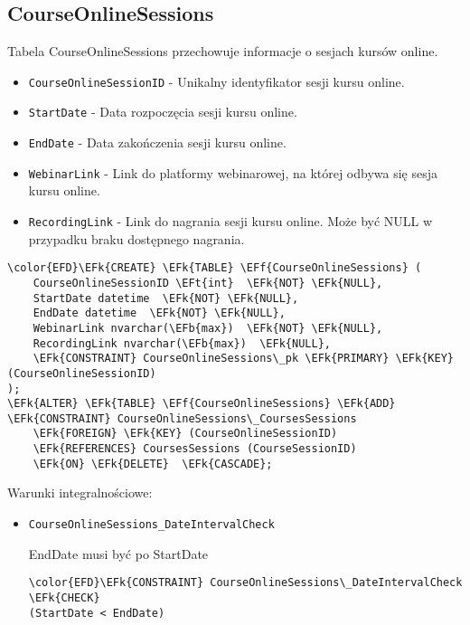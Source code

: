 \documentclass[11pt]{article}
\newcommand{\EFk}[1]{\textcolor{EFk}{\textbf{#1}}} %
\newcommand{\EFb}[1]{\textcolor{EFb}{\textbf{#1}}} %
\newcommand{\EFf}[1]{\textcolor{EFf}{#1}} %
\newcommand{\EFt}[1]{\textcolor{EFt}{\textbf{#1}}} %
\begin{document}
\subsection{CourseOnlineSessions}
\label{sec:org0bfe470}
Tabela CourseOnlineSessions przechowuje informacje o sesjach kursów online.
\begin{itemize}
\item \texttt{CourseOnlineSessionID} - Unikalny identyfikator sesji kursu online.
\item \texttt{StartDate} - Data rozpoczęcia sesji kursu online.
\item \texttt{EndDate} - Data zakończenia sesji kursu online.
\item \texttt{WebinarLink} - Link do platformy webinarowej, na której odbywa się sesja kursu online.
\item \texttt{RecordingLink} - Link do nagrania sesji kursu online. Może być NULL w przypadku braku dostępnego nagrania.
\end{itemize}
\begin{Code}
\begin{Verbatim}
\color{EFD}\EFk{CREATE} \EFk{TABLE} \EFf{CourseOnlineSessions} (
    CourseOnlineSessionID \EFt{int}  \EFk{NOT} \EFk{NULL},
    StartDate datetime  \EFk{NOT} \EFk{NULL},
    EndDate datetime  \EFk{NOT} \EFk{NULL},
    WebinarLink nvarchar(\EFb{max})  \EFk{NOT} \EFk{NULL},
    RecordingLink nvarchar(\EFb{max})  \EFk{NULL},
    \EFk{CONSTRAINT} CourseOnlineSessions\_pk \EFk{PRIMARY} \EFk{KEY}  (CourseOnlineSessionID)
);
\EFk{ALTER} \EFk{TABLE} \EFf{CourseOnlineSessions} \EFk{ADD} \EFk{CONSTRAINT} CourseOnlineSessions\_CoursesSessions
    \EFk{FOREIGN} \EFk{KEY} (CourseOnlineSessionID)
    \EFk{REFERENCES} CoursesSessions (CourseSessionID)
    \EFk{ON} \EFk{DELETE}  \EFk{CASCADE};
\end{Verbatim}
\end{Code}
Warunki integralnościowe:


\begin{itemize}
\item \texttt{CourseOnlineSessions\_DateIntervalCheck}

EndDate musi być po StartDate
\begin{Code}
\begin{Verbatim}
\color{EFD}\EFk{CONSTRAINT} CourseOnlineSessions\_DateIntervalCheck \EFk{CHECK}
(StartDate < EndDate)
\end{Verbatim}
\end{Code}
\end{itemize}
\end{document}
